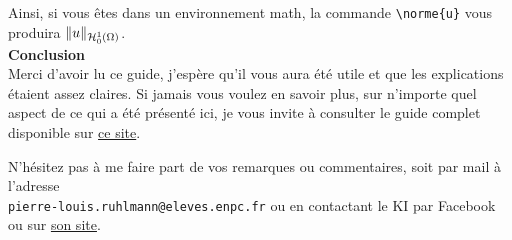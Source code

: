 \documentclass[11pt]{article}				%
\newcommand{\cmd}[2]{\texttt{\textbackslash #1}\texttt{\{#2\}}}
\begin{document}
Ainsi, si vous êtes dans un environnement math, la commande \cmd{norme}{u} vous produira $\|u\|_{\mathcal{H}^1_0\left(\Omega\right)}$.\\

\textbf{Conclusion}\\

Merci d'avoir lu ce guide, j'espère qu'il vous aura été utile et que les explications étaient assez claires. Si jamais vous voulez en savoir plus, sur n'importe quel aspect de ce qui a été présenté ici, je vous invite à consulter le guide complet disponible sur \href{http://latex.enpc.org}{ce site}.

N'hésitez pas à me faire part de vos remarques ou commentaires, soit par mail à l'adresse \\ \texttt{pierre-louis.ruhlmann@eleves.enpc.fr} ou en contactant le KI par Facebook ou sur \href{http://clubinfo.enpc.org}{son site}.
\end{document}
